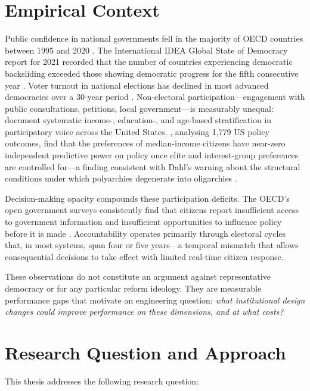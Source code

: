 \documentclass[12pt,a4paper,oneside]{report}
\begin{document}
\section{Empirical Context}

Public confidence in national governments fell in the majority of OECD countries between 1995 and 2020 \citep{norris2011democratic}. The International IDEA Global State of Democracy report for 2021 recorded that the number of countries experiencing democratic backsliding exceeded those showing democratic progress for the fifth consecutive year \citep{idea2021global}. Voter turnout in national elections has declined in most advanced democracies over a 30-year period \citep{dalton2004democratic}. Non-electoral participation---engagement with public consultations, petitions, local government---is measurably unequal: \citet{schlozman2012unheavenly} document systematic income-, education-, and age-based stratification in participatory voice across the United States. \citet{gilens2014testing}, analysing 1{,}779 US policy outcomes, find that the preferences of median-income citizens have near-zero independent predictive power on policy once elite and interest-group preferences are controlled for---a finding consistent with Dahl's warning about the structural conditions under which polyarchies degenerate into oligarchies \citep{dahl1989democracy}.

Decision-making opacity compounds these participation deficits. The OECD's open government surveys consistently find that citizens report insufficient access to government information and insufficient opportunities to influence policy before it is made \citep{oecd2020open}. Accountability operates primarily through electoral cycles that, in most systems, span four or five years---a temporal mismatch that allows consequential decisions to take effect with limited real-time citizen response.

These observations do not constitute an argument against representative democracy or for any particular reform ideology. They are measurable performance gaps that motivate an engineering question: \emph{what institutional design changes could improve performance on these dimensions, and at what costs?}

\section{Research Question and Approach}

This thesis addresses the following research question:
\end{document}
